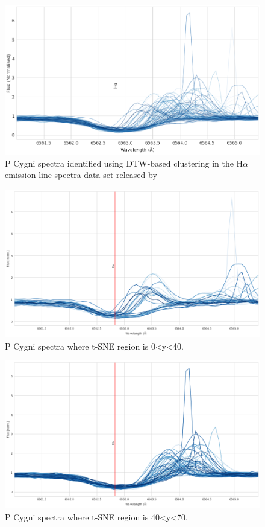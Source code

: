 \begin{figure}[!htb]
\centering
\includegraphics[scale=0.45]{figures/pcygni.png}
\caption{P Cygni spectra identified using DTW-based clustering in the H$\alpha$ emission-line spectra data set released by \citet{vcotar2021galah}}
\end{figure}


\begin{figure}[!htb]
\centering
\includegraphics[scale=0.45]{figures/spectra less than 40.png}
\caption{P Cygni spectra where t-SNE region is 0<y<40. }
\end{figure}

\begin{figure}[!htb]
\centering
\includegraphics[scale=0.45]{figures/spectra greater than 40.png}
\caption{P Cygni spectra where t-SNE region is 40<y<70. }
\end{figure}

